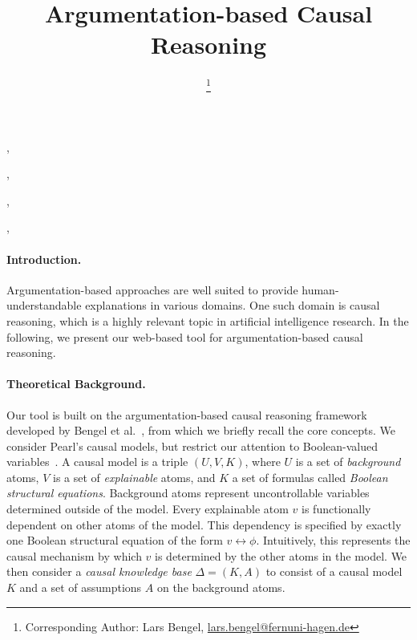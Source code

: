 \documentclass{IOS-Book-Article}
\def\hb{\hbox to 11.5 cm{}}
\def\hb{\hbox to 11.5 cm{}}
\begin{document}
\pagestyle{headings}
\def\thepage{}
\begin{frontmatter}              %


\title{Argumentation-based Causal Reasoning}


\author{ \thanks{Corresponding Author: Lars Bengel, \href{mailto:lars.bengel@fernuni-hagen.de}{lars.bengel@fernuni-hagen.de}}},
\author{ },
\author{ },
\author{ },
\author{ }

\address{Artificial Intelligence Group, University of Hagen, Germany}


\end{frontmatter}

\paragraph{Introduction.}
Argumentation-based approaches are well suited to provide human-understandable explanations in various domains.
One such domain is causal reasoning, which is a highly relevant topic in artificial intelligence research.
In the following, we present our web-based tool for argumentation-based causal reasoning.

\paragraph{Theoretical Background.}
Our tool is built on the argumentation-based causal reasoning framework developed by Bengel et al.~\cite{DBLP:conf/comma/BengelBRT22,DBLP:conf/ratio/BengelBRT24}, from which we briefly recall the core concepts.
We consider Pearl's causal models, but restrict our attention to Boolean-valued variables~\cite{pearl2000causality}.
A causal model is a triple $(U,V,K)$, where $U$ is a set of \emph{background} atoms, $V$ is a set of \emph{explainable} atoms, and $K$ a set of formulas called \emph{Boolean structural equations}.
Background atoms represent uncontrollable variables determined outside of the model.
Every explainable atom $v$ is functionally dependent on other atoms of the model.
This dependency is specified by exactly one Boolean structural equation of the form $v \leftrightarrow \phi$.
Intuitively, this represents the causal mechanism by which $v$ is determined by the other atoms in the model.
We then consider a \textit{causal knowledge base} $\Delta=(K, A)$ to consist of a causal model $K$ and a set of assumptions $A$ on the background atoms.
\end{document}
